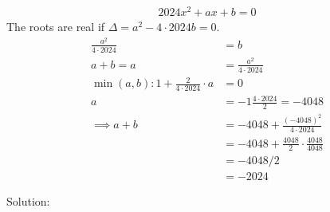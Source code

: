 \begin{align*}
2024 x^{2} + ax + b = 0
\end{align*}
The roots are real if $\Delta = a^{2}-4\cdot2024b=0$. 
\begin{align*}
\frac{a^{2}}{4 \cdot 2024} 
& = b
\\
a + b = a 
& = \frac{a^{2}}{4 \cdot 2024}
\\
\min(a,b):
1 + \frac{2}{4 \cdot 2024} \cdot a
& = 0
\\
a
& = -1 \frac{4 \cdot 2024}{2} 
= -4048
\\
\implies
a + b 
& = -4048 + \frac{(-4048)^{2}}{4 \cdot 2024}
\\
& = -4048 + \frac{4048 }{2} \cdot \frac{4048}{4048}
\\
& = -4048/2
\\
& = -2024
\end{align*}

Solution: 
